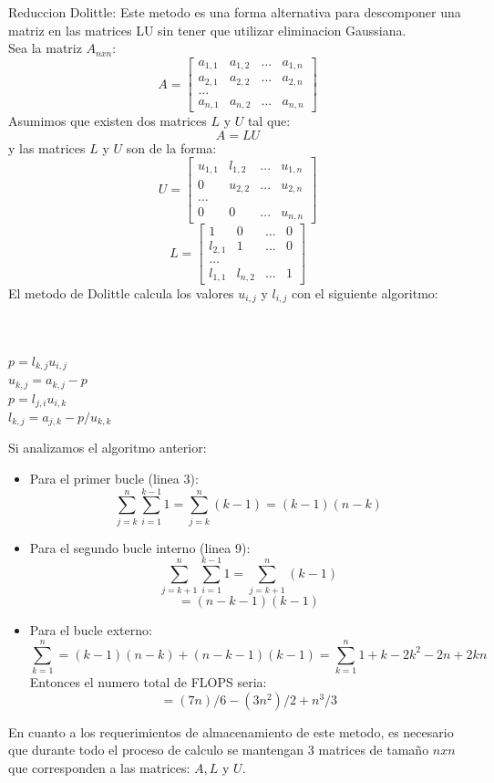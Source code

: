 \documentclass[12pt]{article}
\begin{document}
Reduccion Dolittle:
Este metodo es una forma alternativa para descomponer una matriz en las matrices LU sin tener que utilizar eliminacion Gaussiana.
\\ Sea la matriz $A_{nxn}$:
$$A=\begin{bmatrix}
    a_{1,1}&a_{1,2}&...&a_{1,n}\\
    a_{2,1}&a_{2,2}&...&a_{2,n}\\
    ...\\
    a_{n,1}&a_{n,2}&...&a_{n,n}
\end{bmatrix}$$
Asumimos que existen dos matrices $L$ y $U$ tal que:
$$A=LU$$
y las matrices $L$ y $U$ son de la forma:
$$U=\begin{bmatrix}
    u_{1,1}&l_{1,2}&...&u_{1,n}\\
    0&u_{2,2}&...&u_{2,n}\\
    ...\\
    0&0&...&u_{n,n}
\end{bmatrix}$$
$$L=\begin{bmatrix}
    1&0&...&0\\
    l_{2,1}&1&...&0\\
    ...\\
    l_{1,1}&l_{n,2}&...&1
\end{bmatrix}$$
El metodo de Dolittle calcula los valores $u_{i,j}$ y $l_{i,j}$ con el siguiente algoritmo: \\\\
\begin{algorithmic}[1]
           \\ \qquad\qquad $p=l_{k,j}u_{i,j}$
        \EndFor
        \\ \qquad\quad$u_{k,j}=a_{k,j}-p$
    \EndFor
           \\ \qquad\qquad $p=l_{j,i}u_{i,k}$
        \EndFor
        \\ \qquad\quad$l_{k,j}=a_{j,k}-p/u_{k,k}$
    \EndFor
\EndFor
\end{algorithmic}
Si analizamos el algoritmo anterior:
\begin{itemize}
    \item Para el primer bucle (linea 3):
    $$\sum_{j=k}^{n}\sum_{i=1}^{k-1}1=\sum_{j=k}^{n}(k-1)=(k-1)(n-k)$$
    \item Para el segundo bucle interno (linea 9):
    $$\sum_{j=k+1}^{n}\sum_{i=1}^{k-1}1=\sum_{j=k+1}^{n}(k-1)$$
    $$=(n-k-1)(k-1)$$
    \item Para el bucle externo:
     $$\sum_{k=1}^{n}=(k-1)(n-k)+(n-k-1)(k-1)=\sum_{k=1}^{n}1 + k - 2 k^2 - 2 n + 2 k n$$
     Entonces el numero total de FLOPS seria:
     $$=(7 n)/6 - (3 n^2)/2 + n^3/3$$
     
         
     
\end{itemize}
En cuanto a los requerimientos de almacenamiento de este metodo, es necesario que durante todo el proceso de calculo se mantengan 3 matrices de tamaño $nxn$ que corresponden a las matrices: $A, L$ y $U$.
\end{document}
